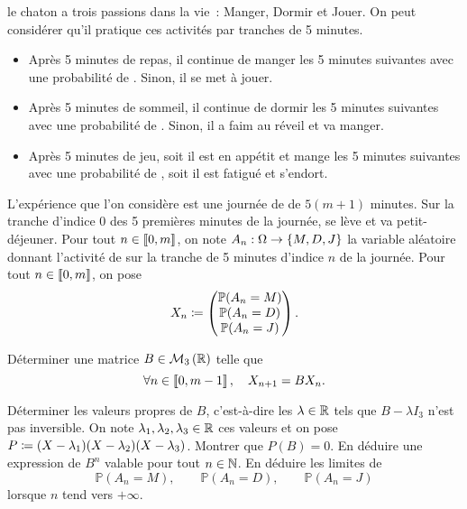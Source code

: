 \documentclass{magnolia}
\begin{document}
 le chaton a trois passions dans la vie~: Manger, Dormir et Jouer. On peut
  considérer qu'il pratique ces activités par tranches de 5 minutes.
  \begin{itemize}
  \item Après 5 minutes de repas, il continue de manger les 5 minutes suivantes avec une
    probabilité de . Sinon, il se met à jouer.
  \item Après 5 minutes de sommeil, il continue de dormir les 5 minutes suivantes avec une
    probabilité de . Sinon, il a faim au réveil et va manger.
  \item Après 5 minutes de jeu, soit il est en appétit et mange les 5 minutes suivantes
    avec une probabilité de , soit il est fatigué et s'endort.
  \end{itemize}
  L'expérience que l'on considère est une journée de  de $5(m+1)$ minutes. Sur la
  tranche d'indice 0 des 5 premières minutes de la journée,  se lève et va
  petit-déjeuner. Pour tout $n\in\left\llbracket 0,m\right\rrbracket$, on note $A_n:\Omega\to\left\{M,D,J\right\}$ la
  variable aléatoire donnant l'activité de  sur la tranche de 5 minutes
  d'indice $n$ de la journée. Pour tout
  $n\in\left\llbracket 0,m\right\rrbracket$, on pose
  \[X_n\coloneqq
    \begin{pmatrix}
    \mathbb{P}(A_n=M)\\
    \mathbb{P}(A_n=D)\\
    \mathbb{P}(A_n=J)
    \end{pmatrix}.\]
  \begin{questions}
  \question Déterminer une matrice $B\in\mathcal{M}_{3}\left(\mathbb{R}\right)$ telle que
    \[\forall n\in\left\llbracket 0,m-1\right\rrbracket,\quad X_{n+1}=B X_n.\]
  \question
    \begin{questions}
    \question Déterminer les valeurs propres de $B$, c'est-à-dire les $\lambda\in\mathbb{R}$ tels
      que $B-\lambda I_3$ n'est pas inversible.
    \enonce On note $\lambda_1,\lambda_2,\lambda_3\in\mathbb{R}$ ces valeurs et on pose
      $P\coloneqq(X-\lambda_1)(X-\lambda_2)(X-\lambda_3)$.
    \question Montrer que $P(B)=0$. En déduire une expression de $B^n$ valable pour tout
      $n\in\mathbb{N}$.
    \question En déduire les limites de
      \[\mathbb{P}(A_n=M),\qquad
        \mathbb{P}(A_n=D),\qquad
        \mathbb{P}(A_n=J)\]
      lorsque $n$ tend vers $+\infty$.
    \end{questions}
  \end{questions}

\end{document}
